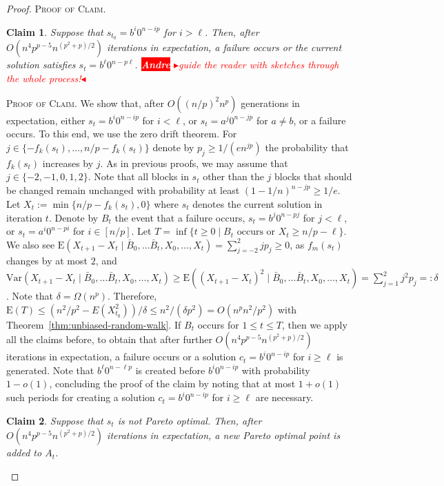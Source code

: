 \documentclass[
sigconf = false, %
review = false, %
screen = true, %
anonymous = true, %
format=acmsmall
]{acmart}
\newcommand*{\E}{\mathrm{E}}
\newtheorem{claim}{Claim}
\newenvironment{proofofclaim}{\textsc{Proof of Claim.}}{\hfill\scriptsize\scalebox{1}{$\blacksquare$}}
\newcommand{\nbc}[3]{
		{\colorbox{#3}{\bfseries\sffamily\scriptsize\textcolor{white}{#1}}}
		{\textcolor{#3}{\sf\small$\blacktriangleright$\textit{#2}$\blacktriangleleft$}}
}
\newcommand{\andre}[1]{\nbc{Andre}{#1}{red}}
\begin{document}
\begin{proof}
\begin{proofofclaim}
\end{proofofclaim}

\begin{claim}
	\label{cl:small-way-back}
	Suppose that $s_{t_0} =b^{i}0^{n-ip}$ for $i > \ell$. Then, after $O(n^4p^{p-5} n^{(p^2+p)/2})$ iterations in expectation, a failure occurs or the current solution satisfies $s_t =b^\ell 0^{n-p\ell}$. \andre{guide the reader with sketches through the whole process!}
\end{claim}

\begin{proofofclaim}
	We show that, after $O((n/p)^2 n^p)$ generations in expectation, either $s_t =b^i0^{n-ip}$ for $i < \ell$, or $s_t =a^j0^{n-jp}$ for $a \neq b$, or a failure occurs. To this end, we use the zero drift theorem. For $j \in \{-f_k(s_t), \ldots , n/p-f_k(s_t)\}$ denote by $p_j \geq 1/(en^{jp})$ the probability that $f_k(s_t)$ increases by $j$.
	As in previous proofs, we may assume that $j \in \{-2,-1,0,1,2\}$. Note that all blocks in $s_t$ other than the $j$ blocks that should be changed remain unchanged with probability at least $(1-1/n)^{n-jp} \geq 1/e$. Let $X_t:=\min\{n/p-f_k(s_t),0\}$ where $s_t$ denotes the current solution in iteration $t$. Denote by $B_t$ the event that a failure occurs, $s_t=b^j 0^{n-pj}$ for $j < \ell$, or $s_t=a^i 0^{n-pi}$ for $i \in [n/p]$. Let $T=\inf\{t \geq 0 \mid B_t \text{ occurs or } X_t \geq n/p - \ell\}$. We also see $\E(X_{t+1}-X_t \mid \bar{B}_0, \ldots \bar{B}_t,X_0, \ldots , X_t) = \sum_{j=-2}^2 j p_j \geq 0$, as $f_m(s_t)$ changes by at most $2$, and $\text{Var}(X_{t+1}-X_t \mid \bar{B}_0, \ldots \bar{B}_t, X_0, \ldots , X_t) \geq \E((X_{t+1}-X_t)^2 \mid \bar{B}_0, \ldots \bar{B}_t, X_0, \ldots , X_t) = \sum_{j=1}^2 j^2 p_j =:\delta$. Note that $\delta = \Omega(n^p)$. Therefore, $\E(T) \leq (n^2/p^2-E(X_{t_0}^2))/\delta \leq n^2/(\delta p^2) = O(n^p n^2/p^2)$ with Theorem~\ref{thm:unbiased-random-walk}. If $B_t$ occurs for $1 \leq t \leq T$, then we apply all the claims before, to obtain that after further $O(n^4p^{p-5}n^{(p^2+p)/2})$ iterations in expectation, a failure occurs or a solution $c_t=b^i0^{n-ip}$ for $i \geq \ell$ is generated. Note that $b^\ell0^{n-\ell p}$ is created before $b^i0^{n-i p}$ with probability $1-o(1)$, concluding the proof of the claim by noting that at most $1+o(1)$ such periods for creating a solution $c_t=b^i0^{n-ip}$ for $i \geq \ell$ are necessary.   
\end{proofofclaim}

\begin{claim}
	\label{cl:climbing-to-front}
	Suppose that $s_t$ is not Pareto optimal. Then, after $O(n^4p^{p-5}n^{(p^2+p)/2})$ iterations in expectation, a new Pareto optimal point is added to $A_t$.   
\end{claim}


\end{proof}
\end{document}
